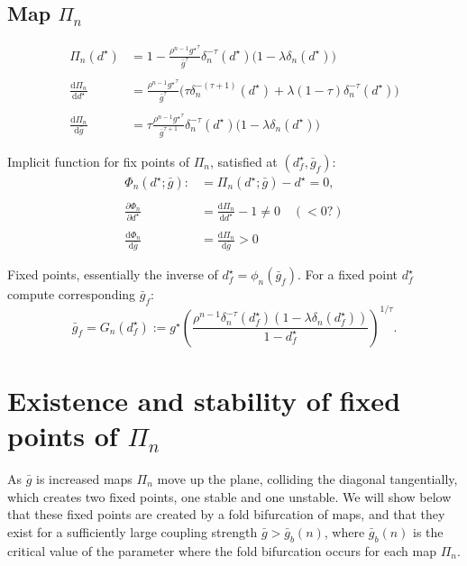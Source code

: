 \documentclass[12pt,authoryear]{elsarticle}
\newcommand{\gbar}{\bar g}
\begin{document}
\subsection{Map $\Pi_{n}$}
\begin{align}
  \Pi_{n}(d^{\star})&= 1-
\frac{\rho^{n-1}{g^{\star}}^{\tau}}{{\bar g}^{\tau}}\delta_{n}^{-\tau}(d^{\star})\Big(1-\lambda\delta_{n}(d^{\star})\Big)\\
  \nonumber\\
  \frac{\mathrm{d}\Pi_{n}}{\mathrm{d}d^{\star}} &= \frac{\rho^{n-1}{g^{\star}}^{\tau}}{\bar g^{\tau}}\Big(\tau \delta_{n}^{-(\tau+1)}(d^{\star})+\lambda(1-\tau) \delta_{n}^{-\tau}(d^{\star})\Big)\\
  \nonumber\\
  \frac{\mathrm{d}\Pi_{n}}{\mathrm{d}\bar g} &= \tau\frac{\rho^{n-1}{g^{\star}}^{\tau}}{\bar g^{\tau+1}}\delta_{n}^{-\tau}(d^{\star})\Big(1-\lambda\delta_{n}(d^{\star})\Big)
\end{align}

\noindent
Implicit function for fix points of $\Pi_{n}$, satisfied at $(d^{\star}_{f}, \bar g_{f})$:
\begin{align}
  \Phi_{n}(d^{\star}; \bar g):&=\Pi_{n}(d^{\star}; \bar g)-d^{\star}=0,\\
  \nonumber\\
  \frac{\partial \Phi_{n}}{\partial d^{\star}} &= \frac{\mathrm{d} \Pi_{n}}{\mathrm{d}d^{\star}} - 1 \neq 0 \quad (< 0?)\\
  \nonumber\\
  \frac{\mathrm{d}\Phi_{n}}{\mathrm{d}\bar g} &= \frac{\mathrm{d}\Pi_{n}}{\mathrm{d}\bar g} > 0
\end{align}

\noindent
Fixed points, essentially the inverse of $d_{f}^{\star}=\phi_{n}(\bar g_{f})$. For a fixed point $d_{f}^{\star}$ compute corresponding $\bar g_{f}$:
\begin{equation}
  \bar g_{f} = G_{n}(d^{\star}_{f}) := g^{\star} \left(\frac{\rho^{n-1}\delta_{n}^{-\tau}(d^{\star}_{f})(1-\lambda\delta_{n}(d^{\star}_{f}))}{1-d^{\star}_{f}}\right)^{1/\tau}.
\end{equation}

\section*{Existence and stability of fixed points of $\Pi_{n}$}
As $\gbar$ is increased maps $\Pi_{n}$ move up the plane, colliding the diagonal tangentially, which creates two fixed points, one stable and one unstable.
We will show below that these fixed points are created by a fold bifurcation of maps, and that they exist for a sufficiently large coupling strength $\gbar>\gbar_{b}(n)$, where $\gbar_{b}(n)$ is the critical value of the parameter where the fold bifurcation occurs for each map $\Pi_{n}$.
\end{document}
